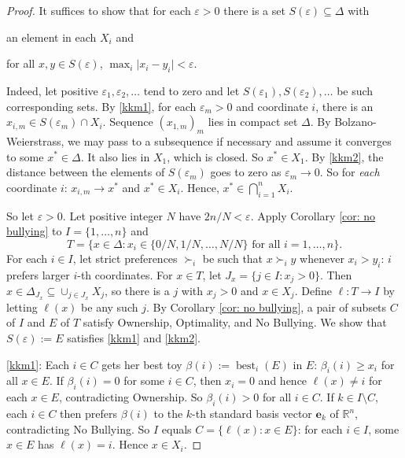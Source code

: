 \documentclass[english, 11pt]{article}
\theoremstyle{plain} %
\theoremstyle{definition}
\newcommand{\be}{\mathbf{e}}
\DeclareMathOperator{\best}{best}
\begin{document}
\begin{proof}
It suffices to show that for each $\varepsilon > 0$ there is a set $S(\varepsilon) \subseteq \Delta$ with
\begin{enumerate*}[label=\emph{(\roman*)}]
\item\label{kkm1} an element in each $X_i$ and
\item\label{kkm2} for all $x, y \in S(\varepsilon)$, $\max_i \lvert x_i - y_i \rvert < \varepsilon$.
\end{enumerate*}
Indeed, let positive $\varepsilon_1, \varepsilon_2, \ldots$ tend to zero and let $S(\varepsilon_1), S(\varepsilon_2), \ldots$ be such corresponding sets. By \ref{kkm1}, for each $\varepsilon_m > 0$ and coordinate $i$, there is an $x_{i,m} \in S(\varepsilon_m) \cap X_i$. Sequence $(x_{1,m})_{m}$ lies in compact set $\Delta$. By Bolzano-Weierstrass, we may pass to a subsequence if necessary and assume it converges to some $x^* \in \Delta$. It also lies in $X_1$, which is closed. So $x^* \in X_1$. By \ref{kkm2}, the distance between the elements of $S(\varepsilon_m)$ goes to zero as $\varepsilon_m \to 0$. So for \emph{each\/} coordinate $i$: $x_{i,m} \to x^*$ and $x^* \in X_i$. Hence, $x^* \in \bigcap_{i=1}^n X_i$.

So let $\varepsilon > 0$. Let positive integer $N$ have $2n/N < \varepsilon$. Apply Corollary \ref{cor: no bullying} to $I = \{1, \ldots, n\}$ and
\[
T = \{x \in \Delta: x_i \in \{0/N, 1/N, \ldots, N/N\} \text{ for all } i = 1, \ldots, n\}.
\]
For each $i \in I$, let strict preferences $\succ_i$ be such that $x \succ_i y$ whenever $x_i > y_i$: $i$ prefers larger $i$-th coordinates. For $x \in T$, let $J_x = \{j \in I: x_j > 0\}$. Then $x \in \Delta_{J_x} \subseteq \cup_{j \in J_x} X_j$, so there is a $j$ with $x_j > 0$ and $x \in X_j$. Define $\ell: T \to I$ by letting $\ell(x)$ be any such $j$. By Corollary \ref{cor: no bullying}, a pair of subsets $C$ of $I$ and $E$ of $T$ satisfy Ownership, Optimality, and No Bullying. We show that $S(\varepsilon) := E$ satisfies \ref{kkm1} and \ref{kkm2}.

\ref{kkm1}: Each $i \in C$ gets her best toy $\beta(i) := \best_i(E)$ in $E$: $\beta_i(i) \geq x_i$ for all $x \in E$. If $\beta_i(i) = 0$ for some $i \in C$, then $x_i = 0$ and hence $\ell(x) \neq i$ for each $x \in E$, contradicting Ownership. So $\beta_i(i) > 0$ for all $i \in C$. If $k \in I \setminus C$, each $i \in C$ then prefers $\beta(i)$ to the $k$-th standard basis vector $\be_k$ of $\mathbb{R}^n$, contradicting No Bullying. So $I$ equals $C = \{\ell(x): x \in E\}$: for each $i \in I$, some $x \in E$ has $\ell(x) = i$. Hence $x \in X_i$.


\end{proof}
\end{document}
